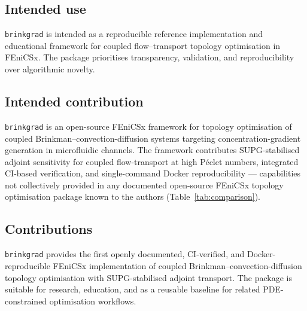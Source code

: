 \subsection*{Intended use}

\texttt{brinkgrad} is intended as a reproducible reference implementation
and educational framework for coupled flow--transport topology optimisation
in FEniCSx.
The package prioritises transparency, validation, and reproducibility
over algorithmic novelty.

\subsection*{Intended contribution}

\texttt{brinkgrad} is an open-source FEniCSx framework
for topology optimisation of coupled Brinkman--convection-diffusion
systems targeting concentration-gradient generation
in microfluidic channels.
The framework contributes SUPG-stabilised adjoint sensitivity
for coupled flow-transport at high P\'{e}clet numbers,
integrated CI-based verification, and single-command Docker
reproducibility --- capabilities not collectively provided
in any documented open-source FEniCSx topology optimisation package
known to the authors (Table~\ref{tab:comparison}).

\subsection*{Contributions}

\texttt{brinkgrad} provides the first openly documented,
CI-verified, and Docker-reproducible FEniCSx implementation
of coupled Brinkman--convection-diffusion topology optimisation
with SUPG-stabilised adjoint transport.
The package is suitable for research, education, and
as a reusable baseline for related PDE-constrained
optimisation workflows.


